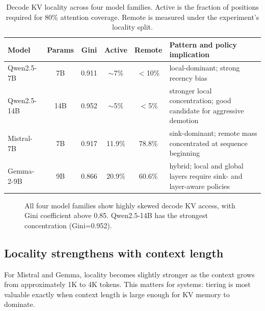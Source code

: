 \documentclass[11pt]{article}
\newcommand{\pct}{\%}
\theoremstyle{definition}
\theoremstyle{plain}
\begin{document}
\begin{table}[t]
\centering
\caption{Decode KV locality across four model families.  Active is the fraction of positions required for 80\pct{} attention coverage.  Remote is measured under the experiment's locality split.}
\label{tab:model-locality}
\small
\begin{tabularx}{\linewidth}{lccccY}
\toprule
Model & Params & Gini & Active & Remote & Pattern and policy implication \\
\midrule
Qwen2.5-7B & 7B & 0.911 & $\sim$7\pct{} & $<$10\pct{} & local-dominant; strong recency bias \\
Qwen2.5-14B & 14B & 0.952 & $\sim$5\pct{} & $<$5\pct{} & stronger local concentration; good candidate for aggressive demotion \\
Mistral-7B & 7B & 0.917 & 11.9\pct{} & 78.8\pct{} & sink-dominant; remote mass concentrated at sequence beginning \\
Gemma-2-9B & 9B & 0.866 & 20.9\pct{} & 60.6\pct{} & hybrid; local and global layers require sink- and layer-aware policies \\
\bottomrule
\end{tabularx}
\end{table}

\begin{figure}[t]
\centering
{}
\caption{All four model families show highly skewed decode KV access, with Gini coefficient above 0.85.  Qwen2.5-14B has the strongest concentration (Gini=0.952).}
\label{fig:gini-models}
\end{figure}

\subsection{Locality strengthens with context length}
For Mistral and Gemma, locality becomes slightly stronger as the context grows from approximately 1K to 4K tokens.  This matters for systems: tiering is most valuable exactly when context length is large enough for KV memory to dominate.
\end{document}
